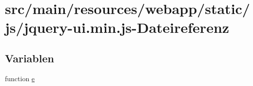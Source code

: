 \hypertarget{jquery-ui_8min_8js}{\section{src/main/resources/webapp/static/js/jquery-\/ui.min.\-js-\/\-Dateireferenz}
\label{jquery-ui_8min_8js}
}
\subsection*{Variablen}
\begin{DoxyCompactItemize}
\item 
function \hyperlink{jquery-ui_8min_8js_a2c038346d47955cbe2cb91e338edd7e1}{e}
\end{DoxyCompactItemize}


